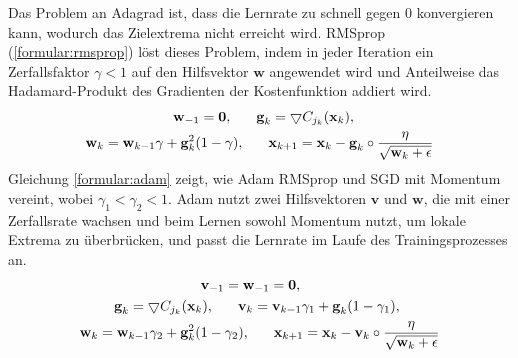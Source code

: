 Das Problem an Adagrad ist, dass die Lernrate zu schnell gegen 0 konvergieren kann, wodurch das Zielextrema nicht erreicht wird.
RMSprop (\ref{formular:rmsprop}) löst dieses Problem, indem in jeder Iteration ein Zerfallsfaktor $\gamma < 1$ auf den Hilfsvektor $\textbf{w}$ angewendet wird
und Anteilweise das Hadamard-Produkt des Gradienten der Kostenfunktion addiert wird.
\begin{align}
    \label{formular:rmsprop}
    \textbf{w}_{-1} = \textbf{0}, \hspace{0.6cm}
    \textbf{g}_k = \bigtriangledown C_{j_k}(\textbf{x}_k), \hspace{2cm} \nonumber\\
    \textbf{w}_k = \textbf{w}_{k-1}\gamma + \textbf{g}_k^2 (1-\gamma), \hspace{0.6cm}
    \textbf{x}_{k+1} = \textbf{x}_k - \textbf{g}_k \circ \frac{\eta}{\sqrt{\textbf{w}_k + \epsilon}}
\end{align}
Gleichung \ref{formular:adam} zeigt, wie Adam RMSprop und SGD mit Momentum vereint, wobei $\gamma_1 < \gamma_2 < 1$.
Adam nutzt zwei Hilfsvektoren $\textbf{v}$ und $\textbf{w}$, die mit einer Zerfallsrate wachsen und beim Lernen
sowohl Momentum nutzt, um lokale Extrema zu überbrücken, und passt die Lernrate im Laufe des Trainingsprozesses an.
\begin{align}
    \label{formular:adam}
    \textbf{v}_{-1} = \textbf{w}_{-1} = \textbf{0}, \hspace{3.5cm} \nonumber\\
    \textbf{g}_k = \bigtriangledown C_{j_k}(\textbf{x}_k), \hspace{0.6cm}
    \textbf{v}_k = \textbf{v}_{k-1}\gamma_1 + \textbf{g}_k (1-\gamma_1), \hspace{1cm} \nonumber\\
    \textbf{w}_k = \textbf{w}_{k-1}\gamma_2 + \textbf{g}_k^2 (1-\gamma_2), \hspace{0.6cm}
    \textbf{x}_{k+1} = \textbf{x}_k - \textbf{v}_k \circ \frac{\eta}{\sqrt{\textbf{w}_k + \epsilon}}
\end{align}